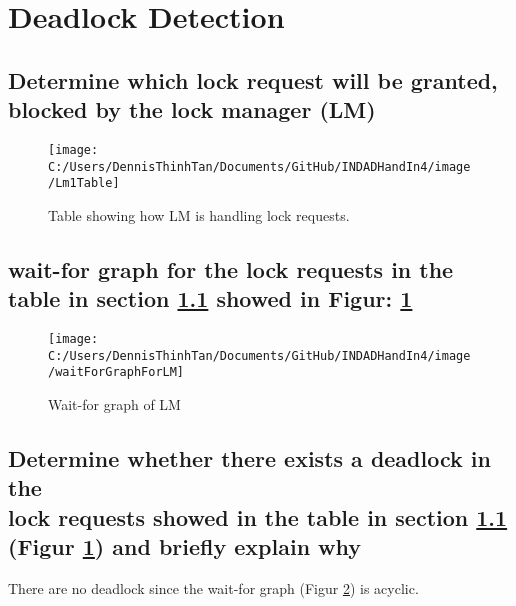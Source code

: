 \section{Deadlock Detection}
\subsection{Determine which lock request will be granted, blocked by the lock manager (LM)} \label{lmsection}
\begin{figure}[H]
\centering
\texttt{[image: C:/Users/DennisThinhTan/Documents/GitHub/INDADHandIn4/image/Lm1Table]}
\caption[Table showing how LM is handling locks]{Table showing how LM is handling lock requests.}
\label{fig:LmTable}
\end{figure}
\pagebreak
\subsection{wait-for graph for the lock requests in the table in section \ref{lmsection} showed in Figur: \ref{fig:LmTable}}
	
\begin{figure}[H]
\centering
\texttt{[image: C:/Users/DennisThinhTan/Documents/GitHub/INDADHandIn4/image/waitForGraphForLM]}
\caption[Wait-for graph of LM]{}
\caption{Wait-for graph of LM}
\label{fig:waitForGraphForLM}
\end{figure}
\pagebreak
\subsection{Determine whether there exists a deadlock in the \\lock requests showed in the table in section \ref{lmsection} (Figur \ref{fig:LmTable}) and briefly explain why}
There are no deadlock since the wait-for graph (Figur \ref{fig:waitForGraphForLM}) is acyclic.

